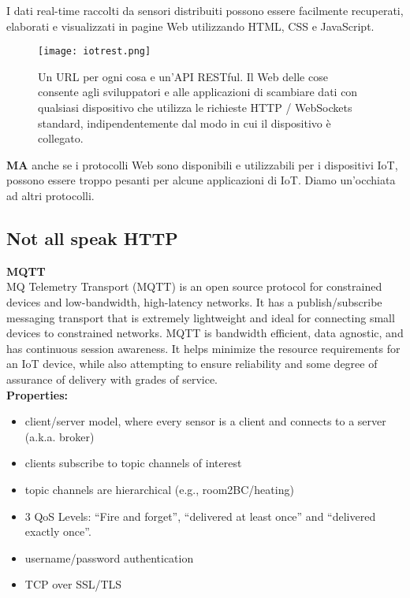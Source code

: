I dati real-time raccolti da sensori distribuiti possono essere facilmente
recuperati, elaborati e visualizzati in pagine Web utilizzando HTML, CSS e
JavaScript.

\begin{figure}[H]
  \centering
  \texttt{[image: iotrest.png]}
  \caption{Un URL per ogni cosa e un'API RESTful.
Il Web delle cose consente agli sviluppatori e alle applicazioni di scambiare
dati con qualsiasi dispositivo che utilizza le richieste HTTP / WebSockets
standard, indipendentemente dal modo in cui il dispositivo è collegato.}
  \label{fig:iotrest}
\end{figure}

\textbf{MA} anche se i protocolli Web sono disponibili e utilizzabili per i
dispositivi IoT, possono essere troppo pesanti per alcune applicazioni di IoT.
Diamo un'occhiata ad altri protocolli.

\subsection{Not all speak HTTP}

\textbf{MQTT}\\

MQ Telemetry Transport (MQTT) is an open source protocol for constrained
devices and low-bandwidth, high-latency networks.
It has a publish/subscribe messaging transport that is extremely lightweight
and ideal for connecting small devices to constrained networks.
MQTT is bandwidth efficient, data agnostic, and has continuous session
awareness. It helps minimize the resource requirements for an IoT device,
while also attempting to ensure reliability and some degree of assurance of
delivery with grades of service.\\

\textbf{Properties:}

\begin{itemize}
  \item client/server model, where every sensor is a client and connects to a
server (a.k.a. broker)
  \item clients subscribe to topic channels of interest
  \item topic channels are hierarchical (e.g., room2BC/heating)
  \item 3 QoS Levels: ``Fire and forget'',  ``delivered at least once'' and
 ``delivered exactly once''.
  \item username/password authentication
  \item TCP over SSL/TLS
\end{itemize}

